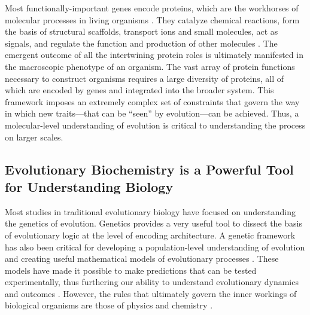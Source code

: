 Most functionally-important genes encode proteins, which are the workhorses
of molecular processes in living organisms \citep{alberts_protein_2002,whitford_proteins:_2005}.
They catalyze chemical reactions, form the basis of structural scaffolds,
transport ions and small molecules, act as signals, and regulate the
function and production of other molecules \citep{alberts_protein_2002,whitford_proteins:_2005}.
The emergent outcome of all the intertwining protein roles is ultimately
manifested in the macroscopic phenotype of an organism. The vast array
of protein functions necessary to construct organisms requires a large
diversity of proteins, all of which are encoded by genes and integrated
into the broader system. This framework imposes an extremely complex
set of constraints that govern the way in which new traits---that can
be “seen” by evolution---can be achieved. Thus, a molecular-level understanding
of evolution is critical to understanding the process on larger scales. 

\subsection{Evolutionary Biochemistry is a Powerful Tool for Understanding Biology}

Most studies in traditional evolutionary biology have focused on understanding
the genetics of evolution. Genetics provides a very useful tool to
dissect the basis of evolutionary logic at the level of encoding architecture.
A genetic framework has also been critical for developing a population-level
understanding of evolution and creating useful mathematical models
of evolutionary processes \citep{fisher_genetical_nodate,wright_evolution_1931,kimura_number_1964,crow_mathematics_1970,gillespie_simple_1983,gillespie_molecular_1984,nei_relative_1988,gillespie_population_1998,orr_population_2002,orr_probability_2005}.
These models have made it possible to make predictions that can be
tested experimentally, thus furthering our ability to understand evolutionary
dynamics and outcomes \citep{hohenlohe_using_2010,romiguier_comparative_2014,mackay_epistasis_2014,tiffin_advances_2014,huang_population_2014,lynch_mutation_2016}.
However, the rules that ultimately govern the inner workings of biological
organisms are those of physics and chemistry \citep{berg_random_1993,sella_application_2005,dill_molecular_2010,kondo_reaction-diffusion_2010,dill_physical_2011,ghosh_role_2016}.

